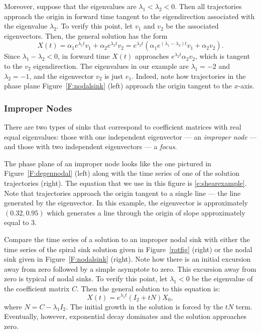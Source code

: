 \documentclass{ximera}
\begin{document}
Moreover, suppose that the eigenvalues are $\lambda_1 < \lambda_2
< 0$.  Then all trajectories approach the origin in forward time
tangent to the eigendirection associated with the eigenvalue
$\lambda_2$.   To verify this point, let $v_1$ and $v_2$ be the
associated eigenvectors.  Then, the general solution has the
form
\[
X(t) = \alpha_1e^{\lambda_1 t}v_1 + \alpha_2e^{\lambda_2 t}v_2
= e^{\lambda_2 t}(\alpha_1e^{(\lambda_1-\lambda_2)t}v_1 + \alpha_2v_2).
\]
Since $\lambda_1-\lambda_2<0$, in forward time $X(t)$ approaches
$e^{\lambda_2 t}\alpha_2v_2$, which is tangent to the $v_2$
eigendirection.  The eigenvalues in our example are $\lambda_1=-2$
and $\lambda_2=-1$, and the eigenvector $v_2$ is just $e_1$.
Indeed, note how trajectories in the phase plane  Figure~\ref{F:nodalsink}
(left) approach the origin tangent to the $x$-axis.

\subsubsection*{Improper Nodes}

There are two types of sinks that correspond to coefficient
matrices with real equal eigenvalues: those with one independent
eigenvector --- an {\em improper node\/} --- and those with two independent
eigenvectors --- a {\em focus\/}.

The phase plane
of an improper node looks like the one pictured in
Figure~\ref{F:degennodal} (left) along with the time series
of one of the solution trajectories (right).  The equation
that we use in this figure is \eqref{e:shearexample}.
Note that trajectories approach the origin tangent to a single
line --- the line generated by the eigenvector.  In this example, the
eigenvector is approximately $(0.32,0.95)$ which generates a line
through the origin of slope approximately equal to $3$.

\begin{figure*}[htb]
           \centerline{%
           }
           \caption{(Left) Phase plane of improper nodal sink
	       \protect\eqref{e:shearexample}.  (Right) Time series of
		a trajectory illustrating the transient excursion
		away from zero.}
           \label{F:degennodal}
\end{figure*}

Compare the time series of a solution to an improper nodal sink
with either the time series of the spiral sink solution given
in Figure~\ref{rotfig} (right) or the nodal sink given in
Figure~\ref{F:nodalsink} (right).  Note how there is an initial
excursion away from zero followed by a simple asymptote to zero.
This excursion away from zero is typical of nodal sinks. To verify
this point, let $\lambda_1<0$ be the eigenvalue of the coefficient
matrix $C$.  Then the general solution to this equation is:
\[
X(t) = e^{\lambda_1 t}(I_2 + tN)X_0,
\]
where $N = C-\lambda_1 I_2$.
The initial growth in the solution is forced by the $tN$ term.
Eventually, however, exponential decay dominates and the solution
approaches zero.
\end{document}
